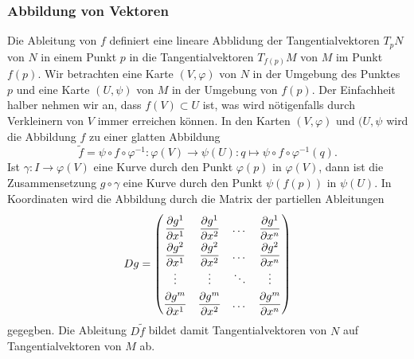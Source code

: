 \subsubsection{Abbildung von Vektoren}
Die Ableitung von $f$ definiert eine lineare Abblidung der
Tangentialvektoren $T_pN$ von $N$ in einem Punkt $p$ in die
Tangentialvektoren $T_{f(p)}M$ von $M$ im Punkt $f(p)$.
Wir betrachten eine Karte $(V,\varphi)$ von $N$ in der Umgebung des Punktes
$p$ und eine Karte $(U,\psi)$ von $M$ in der Umgebung von $f(p)$.
Der Einfachheit halber nehmen wir an, dass $f(V)\subset U$ ist, was wird
nötigenfalls durch Verkleinern von $V$ immer erreichen können.
In den Karten $(V,\varphi)$ und $(U,\psi$ wird die Abbildung
$f$ zu einer glatten Abbildung
\[
\tilde{f}
=
\psi\circ f\circ\varphi^{-1}
\colon
\varphi(V)\to\psi(U)
:
q\mapsto \psi\circ f\circ \varphi^{-1}(q).
\]
Ist $\gamma\colon I\to \varphi(V)$ eine Kurve durch den Punkt $\varphi(p)$
in $\varphi(V)$, dann ist die Zusammensetzung $g\circ \gamma$
eine Kurve durch den Punkt $\psi(f(p))$ in $\psi(U)$.
In Koordinaten wird die Abbildung durch die Matrix der partiellen
Ableitungen
\[
Dg
=
\renewcommand\arraystretch{2.0}
\begin{pmatrix}
 \displaystyle\frac{\partial g^1}{\partial x^1}
&\displaystyle\frac{\partial g^1}{\partial x^2}
&\dots&
 \displaystyle\frac{\partial g^1}{\partial x^n}
\\
 \displaystyle\frac{\partial g^2}{\partial x^1}
&\displaystyle\frac{\partial g^2}{\partial x^2}
&\dots&
 \displaystyle\frac{\partial g^2}{\partial x^n}
\\[-1pt]
\vdots&\vdots&\ddots&\vdots
\\[-3pt]
 \displaystyle\frac{\partial g^m}{\partial x^1}
&\displaystyle\frac{\partial g^m}{\partial x^2}
&\dots&
 \displaystyle\frac{\partial g^m}{\partial x^n}
\end{pmatrix}
\]
gegegben.
Die Ableitung $D\tilde{f}$ bildet damit Tangentialvektoren von $N$
auf Tangentialvektoren von $M$ ab.

%
%
